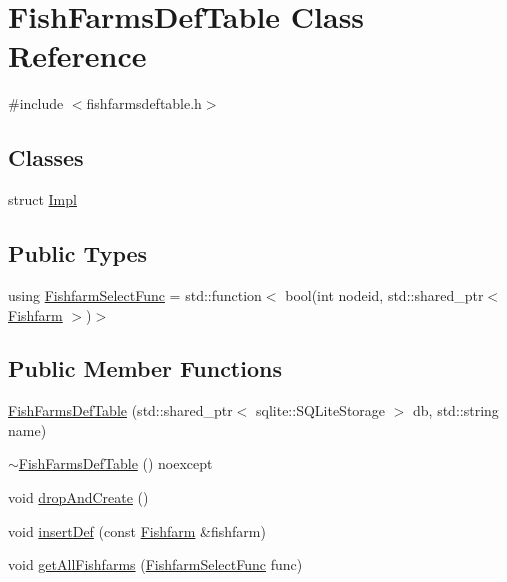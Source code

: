\hypertarget{class_fish_farms_def_table}{}\section{Fish\+Farms\+Def\+Table Class Reference}
\label{class_fish_farms_def_table}


{\ttfamily \#include $<$fishfarmsdeftable.\+h$>$}

\subsection*{Classes}
\begin{DoxyCompactItemize}
\item 
struct \mbox{\hyperlink{struct_fish_farms_def_table_1_1_impl}{Impl}}
\end{DoxyCompactItemize}
\subsection*{Public Types}
\begin{DoxyCompactItemize}
\item 
using \mbox{\hyperlink{class_fish_farms_def_table_aeab850ebda904be43b0b690c789a56b9}{Fishfarm\+Select\+Func}} = std\+::function$<$ bool(int nodeid, std\+::shared\+\_\+ptr$<$ \mbox{\hyperlink{class_fishfarm}{Fishfarm}} $>$)$>$
\end{DoxyCompactItemize}
\subsection*{Public Member Functions}
\begin{DoxyCompactItemize}
\item 
\mbox{\hyperlink{class_fish_farms_def_table_a9f2b076ad975bd67f5d4c2ba5823afbd}{Fish\+Farms\+Def\+Table}} (std\+::shared\+\_\+ptr$<$ sqlite\+::\+S\+Q\+Lite\+Storage $>$ db, std\+::string name)
\item 
\mbox{\hyperlink{class_fish_farms_def_table_a5e5b452ede20a89727a7b8f498928c1d}{$\sim$\+Fish\+Farms\+Def\+Table}} () noexcept
\item 
void \mbox{\hyperlink{class_fish_farms_def_table_a9315e3a212b9ec4ccd0a2cc2ee02830e}{drop\+And\+Create}} ()
\item 
void \mbox{\hyperlink{class_fish_farms_def_table_afc739c5179b900178a1c374e99ece7ca}{insert\+Def}} (const \mbox{\hyperlink{class_fishfarm}{Fishfarm}} \&fishfarm)
\item 
void \mbox{\hyperlink{class_fish_farms_def_table_ac6fc8c8cfb19b252cf28c0e0cc142573}{get\+All\+Fishfarms}} (\mbox{\hyperlink{class_fish_farms_def_table_aeab850ebda904be43b0b690c789a56b9}{Fishfarm\+Select\+Func}} func)
\end{DoxyCompactItemize}


